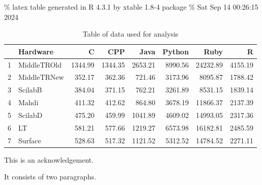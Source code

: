 \documentclass[12pt,halfline,a4paper,]{ouparticle}
\begin{document}
\% latex table generated in R 4.3.1 by xtable 1.8-4 package \% Sat Sep
14 00:26:15 2024

\begin{table}[ht]
\centering
\begin{tabular}{rlrrrrrr}
  \hline
 & Hardware & C & CPP & Java & Python & Ruby & R \\ 
  \hline
1 & MiddleTROld & 1344.99 & 1344.35 & 2653.21 & 8990.56 & 24232.89 & 4155.19 \\ 
  2 & MiddleTRNew & 352.17 & 362.36 & 721.46 & 3173.96 & 8095.87 & 1788.42 \\ 
  3 & ScilabB & 384.04 & 371.15 & 762.21 & 3261.89 & 8531.15 & 1839.14 \\ 
  4 & Mahdi & 411.32 & 412.62 & 864.80 & 3678.19 & 11866.37 & 2137.39 \\ 
  5 & ScilabD & 475.20 & 459.99 & 1041.89 & 4609.02 & 14993.05 & 2317.36 \\ 
  6 & LT & 581.21 & 577.66 & 1219.27 & 6573.98 & 16182.81 & 2485.59 \\ 
  7 & Surface & 528.63 & 517.32 & 1121.52 & 5312.52 & 14784.52 & 2271.11 \\ 
   \hline
\end{tabular}
\caption{Table of data used for analysis} 
\end{table}


\begin{notes}[Acknowledgements]
This is an acknowledgement.

It consists of two paragraphs.
\end{notes}
\end{document}
